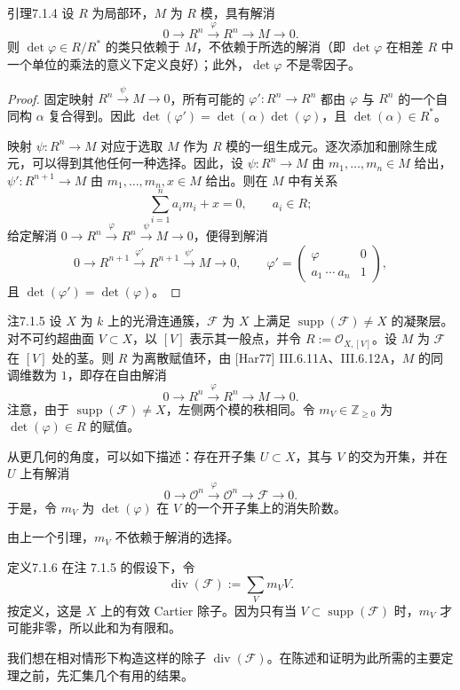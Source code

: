 \begin{origstatement}{引理}{7.1.4}\label{ch07:7.1.4}
设 $R$ 为局部环，$M$ 为 $R$ 模，具有解消
\[
0\longrightarrow R^n\xrightarrow{\varphi}R^n\longrightarrow M\longrightarrow0.
\]
则 $\det\varphi\in R/R^*$ 的类只依赖于 $M$，不依赖于所选的解消（即 $\det\varphi$ 在相差 $R$ 中一个单位的乘法的意义下定义良好）；此外，$\det\varphi$ 不是零因子。
\end{origstatement}
\begin{proof}
固定映射 $R^n\xrightarrow{\psi}M\to0$，所有可能的 $\varphi':R^n\to R^n$ 都由 $\varphi$ 与 $R^n$ 的一个自同构 $\alpha$ 复合得到。因此 $\det(\varphi')=\det(\alpha)\det(\varphi)$，且 $\det(\alpha)\in R^*$。

映射 $\psi:R^n\to M$ 对应于选取 $M$ 作为 $R$ 模的一组生成元。逐次添加和删除生成元，可以得到其他任何一种选择。因此，设 $\psi:R^n\to M$ 由 $m_1,\ldots,m_n\in M$ 给出，$\psi':R^{n+1}\to M$ 由 $m_1,\ldots,m_n,x\in M$ 给出。则在 $M$ 中有关系
\[
\sum_{i=1}^n a_im_i+x=0,\qquad a_i\in R;
\]
给定解消 $0\to R^n\xrightarrow{\varphi}R^n\xrightarrow{\psi}M\to0$，便得到解消
\[
0\longrightarrow R^{n+1}\xrightarrow{\varphi'}R^{n+1}
\xrightarrow{\psi'}M\longrightarrow0,\qquad
\varphi'=\begin{pmatrix}\varphi&0\\a_1\ \cdots\ a_n&1\end{pmatrix},
\]
且 $\det(\varphi')=\det(\varphi)$。
\end{proof}
\begin{origstatement}{注}{7.1.5}\label{ch07:7.1.5}
设 $X$ 为 $k$ 上的光滑连通簇，$\mathcal F$ 为 $X$ 上满足 $\operatorname{supp}(\mathcal F)\ne X$ 的凝聚层。对不可约超曲面 $V\subset X$，以 $[V]$ 表示其一般点，并令 $R:=\mathcal O_{X,[V]}$。设 $M$ 为 $\mathcal F$ 在 $[V]$ 处的茎。则 $R$ 为离散赋值环，由 [Har77] III.6.11A、III.6.12A，$M$ 的同调维数为 $1$，即存在自由解消
\[
0\longrightarrow R^n\xrightarrow{\varphi}R^n\longrightarrow M\longrightarrow0.
\]
注意，由于 $\operatorname{supp}(\mathcal F)\ne X$，左侧两个模的秩相同。令 $m_V\in\mathbb Z_{\geq0}$ 为 $\det(\varphi)\in R$ 的赋值。

从更几何的角度，可以如下描述：存在开子集 $U\subset X$，其与 $V$ 的交为开集，并在 $U$ 上有解消
\[
0\longrightarrow\mathcal O^n\xrightarrow{\varphi}\mathcal O^n\longrightarrow\mathcal F\longrightarrow0.
\]
于是，令 $m_V$ 为 $\det(\varphi)$ 在 $V$ 的一个开子集上的消失阶数。

由上一个引理，$m_V$ 不依赖于解消的选择。
\end{origstatement}
\begin{origstatement}{定义}{7.1.6}\label{ch07:7.1.6}
在注 7.1.5 的假设下，令
\[
\operatorname{div}(\mathcal F):=\sum_V m_VV.
\]
按定义，这是 $X$ 上的有效 Cartier 除子。因为只有当 $V\subset\operatorname{supp}(\mathcal F)$ 时，$m_V$ 才可能非零，所以此和为有限和。
\end{origstatement}
我们想在相对情形下构造这样的除子 $\operatorname{div}(\mathcal F)$。在陈述和证明为此所需的主要定理之前，先汇集几个有用的结果。

